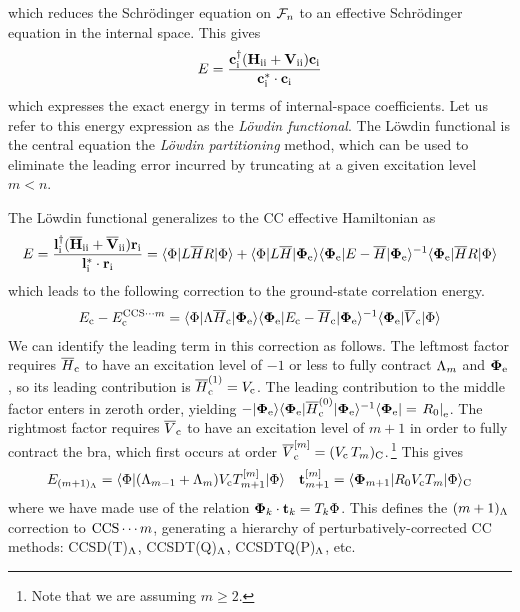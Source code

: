 \documentclass[11pt]{article}
\numberwithin{equation}{section}
\begin{document}
\begin{rmk}
which reduces the Schr\"odinger equation on $\mathcal{F}_n$ to an effective Schr\"odinger equation in the internal space.
This gives
\begin{align}
\label{eq:lowdin-functional}
  E
=
  \frac {
    \mathbf{c}_{\mathrm{i}}^\dagger
    (
      \mathbf{H}_{\mathrm{ii}}
    +
      \mathbf{V}_{\mathrm{ii}}
    )
    \mathbf{c}_{\mathrm{i}}
  }{
    \mathbf{c}_{\mathrm{i}}^*\cdot
    \mathbf{c}_{\mathrm{i}}
  }
\end{align}
which expresses the exact energy in terms of internal-space coefficients.
Let us refer to this energy expression as the \textit{L\"owdin functional}.
The L\"owdin functional is the central equation the \textit{L\"owdin partitioning} method, which can be used to eliminate the leading error incurred by truncating at a given excitation level $m<n$.
\end{rmk}

\begin{rmk}
The L\"owdin functional generalizes to the CC effective Hamiltonian as
\begin{align}
  E
=
\frac {
  \mathbf{l}_{\mathrm{i}}^\dagger
  (
    \overline{\mathbf{H}}_{\mathrm{ii}}
  +
    \overline{\mathbf{V}}_{\mathrm{ii}}
  )
  \mathbf{r}_{\mathrm{i}}
}{
  \mathbf{l}_{\mathrm{i}}^*\cdot
  \mathbf{r}_{\mathrm{i}}
}
=
  \langle\Phi |
  L
  \overline{H}
  R
  |\Phi \rangle
+
  \langle\Phi |
    L
    \overline{H}
  |\mathbf{\Phi }_{\mathrm{e}}\rangle
  \langle\mathbf{\Phi }_{\mathrm{e}}|
    E
  -
    \overline{H}
  |\mathbf{\Phi }_{\mathrm{e}}\rangle^{-1}
  \langle\mathbf{\Phi }_{\mathrm{e}}|
    \overline{H}
    R
  |\Phi \rangle
\end{align}
which leads to the following correction to the ground-state correlation energy.
\begin{align}
  E_{\mathrm{c}}
-
  E_{\mathrm{c}}^{\mathrm{CCS}{\cdots}m}
=
  \langle\Phi |
    \Lambda 
    \overline{H}_{\mathrm{c}}
  |\mathbf{\Phi }_{\mathrm{e}}\rangle
  \langle\mathbf{\Phi }_{\mathrm{e}}|
    E_{\mathrm{c}}
  -
    \overline{H}_{\mathrm{c}}
  |\mathbf{\Phi }_{\mathrm{e}}\rangle^{-1}
  \langle\mathbf{\Phi }_{\mathrm{e}}|
    \overline{V}_{\mathrm{c}}
  |\Phi \rangle
\end{align}
We can identify the leading term in this correction as follows.
The leftmost factor requires $\overline{H}_{\mathrm{c}}$ to have an excitation level of $-1$ or less to fully contract $\Lambda _m$ and $\mathbf{\Phi }_{\mathrm{e}}$, so its leading contribution is
$
  \overline{H}_{\mathrm{c}}^{(1)}
=
  V_{\mathrm{c}}
$.
The leading contribution to the middle factor enters in zeroth order, yielding
$
-
  |\mathbf{\Phi }_{\mathrm{e}}\rangle
  \langle\mathbf{\Phi }_{\mathrm{e}}|
  \overline{H}_{\mathrm{c}}^{(0)}
  |\mathbf{\Phi }_{\mathrm{e}}\rangle^{-1}
  \langle\mathbf{\Phi }_{\mathrm{e}}|
=
\left.
  R_0
\right|_{\mathrm{e}}
$.
The rightmost factor requires $\overline{V}_{\mathrm{c}}$ to have an excitation level of $m+1$ in order to fully contract the bra, which first occurs at order
$
  \overline{V}_{\mathrm{c}}^{[m]}
=
(
  V_{\mathrm{c}}\,
  T_m
)_{\mathrm{C}}
$.\,\footnote{Note that we are assuming $m\geq 2$.}
This gives
\begin{align}
\label{eq:parentheses-lambda}
  E_{(m+1)_{\Lambda }}
=
  \langle\Phi |
    (
      \Lambda _{m-1}
    +
      \Lambda _m
    )
    V_{\mathrm{c}}
    T_{m+1}^{[m]}
  |\Phi \rangle
&&
  \mathbf{t}_{m+1}^{[m]}
=
  \langle\mathbf{\Phi }_{m+1}|R_0V_{\mathrm{c}}T_m|\Phi \rangle_{\mathrm{C}}
\end{align}
where we have made use of the relation
$
  \mathbf{\Phi }_k\cdot
  \mathbf{t}_k
=
  T_k
  \Phi 
$.
This defines the
$
  (m+1)_{\Lambda }
$
correction to
$
  \mathrm{CCS}\cdots m
$,
generating a hierarchy of perturbatively-corrected CC methods:
CCSD(T)$_{\Lambda }$,
CCSDT(Q)$_{\Lambda }$,
CCSDTQ(P)$_{\Lambda }$,
etc.
\end{rmk}
\end{document}

